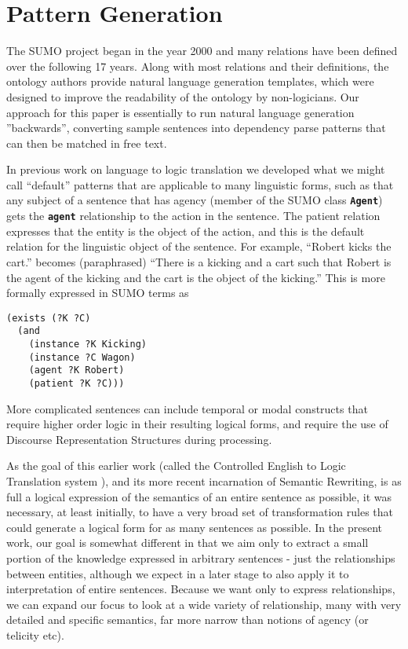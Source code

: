 \documentclass{book}
\newcommand{\tsumo}[1]{{\small \textbf{\texttt{#1}}}}
\begin{document}
\section{Pattern Generation}

The SUMO project began in the year 2000 and many relations have been
defined over the following 17 years.  Along with most relations and their definitions,
the ontology authors provide natural language generation templates, which were
designed to improve the readability of the ontology by non-logicians. Our approach
for this paper is essentially to run natural language generation ''backwards'',
converting sample sentences into dependency parse patterns that can then be matched
in free text.

In previous work on language to logic translation \citep{pl10} we developed what
we might call ``default'' patterns that are applicable to many linguistic forms, such
as that any subject of a sentence that has agency (member of the SUMO class \tsumo{Agent})
gets the \tsumo{agent} relationship to the action in the sentence.  The patient relation
expresses that the entity is the object of the action, and this is the default relation
for the linguistic object of the sentence. For example, ``Robert
kicks the cart.'' becomes (paraphrased) ``There is a kicking and a cart such that
Robert is the agent of the kicking and the cart is the object of the kicking.''  This
is more formally expressed in SUMO terms as

\begin{lstlisting}[basicstyle=\ttfamily\small\bfseries]
(exists (?K ?C)
  (and
    (instance ?K Kicking)
    (instance ?C Wagon)
    (agent ?K Robert)
    (patient ?K ?C)))
\end{lstlisting}

More complicated sentences can include temporal or modal constructs that 
require higher order logic \citep{B14} in their resulting logical forms, and require
the use of Discourse Representation Structures \citep{KampReyle93} during processing.

As the goal of this earlier work (called the Controlled English to Logic
Translation system \citep{pl10}), and its more recent incarnation of Semantic
Rewriting, is as full a logical expression of the semantics of an entire
sentence as possible, it was necessary, at least initially, to have a very broad
set of transformation rules that could generate a logical form for as many
sentences as possible.  In the present work, our goal is somewhat different in
that we aim only to extract a small portion of the knowledge expressed in
arbitrary sentences - just the relationships between entities, although we
expect in a later stage to also apply it to interpretation of entire sentences.
Because we want only to express relationships, we can expand our focus to look
at a wide variety of relationship, many with very detailed and specific
semantics, far more narrow than notions of agency (or telicity etc).
\end{document}
